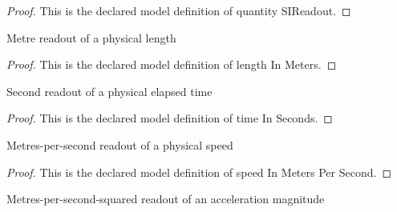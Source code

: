 \begin{proof}
  This is the declared model definition of quantity SIReadout.
\end{proof}
\begin{definition}
  \label{def:physics:phyx-mini-0689:phyxminiproblems-problemphyxmini0689-lengthinmeters}
  Metre readout of a physical length
\end{definition}
\begin{proof}
  This is the declared model definition of length In Meters.
\end{proof}
\begin{definition}
  \label{def:physics:phyx-mini-0689:phyxminiproblems-problemphyxmini0689-timeinseconds}
  Second readout of a physical elapsed time
\end{definition}
\begin{proof}
  This is the declared model definition of time In Seconds.
\end{proof}
\begin{definition}
  \label{def:physics:phyx-mini-0689:phyxminiproblems-problemphyxmini0689-speedinmeterspersecond}
  Metres-per-second readout of a physical speed
\end{definition}
\begin{proof}
  This is the declared model definition of speed In Meters Per Second.
\end{proof}
\begin{definition}
  \label{def:physics:phyx-mini-0689:phyxminiproblems-problemphyxmini0689-accelerationinmeterspersecondsquared}
  Metres-per-second-squared readout of an acceleration magnitude
\end{definition}

